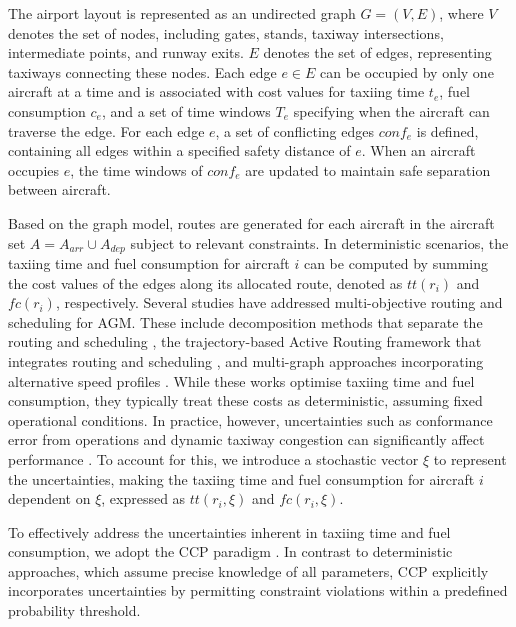 \documentclass{article}
\begin{document}
The airport layout is represented as an undirected graph $G = (V, E)$, where $V$ denotes the set of nodes, including gates, stands, taxiway intersections, intermediate points, and runway exits. $E$ denotes the set of edges, representing taxiways connecting these nodes. Each edge $e \in E$ can be occupied by only one aircraft at a time and is associated with cost values for taxiing time $t_e$, fuel consumption $c_e$, and a set of time windows $T_e$ specifying when the aircraft can traverse the edge. For each edge $e$, a set of conflicting edges $conf_e$ is defined, containing all edges within a specified safety distance of $e$. When an aircraft occupies $e$, the time windows of $conf_e$ are updated to maintain safe separation between aircraft.

Based on the graph model, routes are generated for each aircraft in the aircraft set $A = A_{arr} \cup A_{dep}$ subject to relevant constraints. In deterministic scenarios, the taxiing time and fuel consumption for aircraft $i$ can be computed by summing the cost values of the edges along its allocated route, denoted as $tt(r_i)$ and $fc(r_i)$, respectively. Several studies have addressed multi-objective routing and scheduling for AGM. These include decomposition methods that separate the routing and scheduling \cite{ravizza2013trade}, the trajectory-based Active Routing framework that integrates routing and scheduling \cite{chen2015toward, chen2016toward}, and multi-graph approaches incorporating alternative speed profiles \cite{weiszer2020multi,beke2023routing}. While these works optimise taxiing time and fuel consumption, they typically treat these costs as deterministic, assuming fixed operational conditions. In practice, however, uncertainties such as conformance error from operations and dynamic taxiway congestion can significantly affect performance \cite{zhang2020feasibility,lee2012fast}.  To account for this, we introduce a stochastic vector $\xi$ to represent the uncertainties, making the taxiing time and fuel consumption for aircraft $i$ dependent on $\xi$, expressed as $tt(r_i,\xi)$ and $fc(r_i,\xi)$.

To effectively address the uncertainties inherent in taxiing time and fuel consumption, we adopt the CCP paradigm \cite{charnes1959chance}. In contrast to deterministic approaches, which assume precise knowledge of all parameters, CCP explicitly incorporates uncertainties by permitting constraint violations within a predefined probability threshold. 
\end{document}
